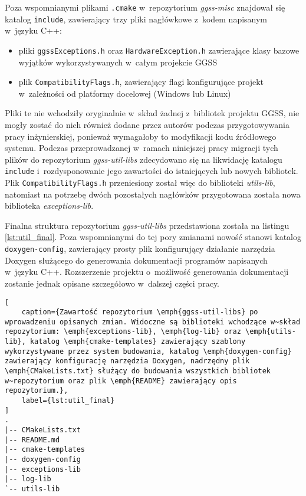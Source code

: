 Poza wspomnianymi plikami \lstinline{.cmake} w~repozytorium \emph{ggss-misc} znajdował się katalog \lstinline{include}, zawierający trzy pliki nagłówkowe z~kodem napisanym w~języku C++:
\begin{itemize}
    \item pliki \lstinline{ggssExceptions.h} oraz \lstinline{HardwareException.h} zawierające klasy bazowe wyjątków wykorzystywanych w~całym projekcie GGSS
    \item plik \lstinline{CompatibilityFlags.h}, zawierający flagi konfigurujące projekt w~zależności od platformy docelowej (Windows lub Linux)
\end{itemize}
Pliki te nie wchodziły oryginalnie w~skład żadnej z~bibliotek projektu GGSS, nie mogły zostać do nich również dodane przez autorów podczas przygotowywania pracy inżynierskiej, ponieważ wymagałoby to modyfikacji kodu źródłowego systemu. Podczas przeprowadzanej w~ramach niniejszej pracy migracji tych plików do repozytorium \emph{ggss-util-libs} zdecydowano się na likwidację katalogu \lstinline{include} i~rozdysponowanie jego zawartości do istniejących lub nowych bibliotek. Plik \lstinline{CompatibilityFlags.h} przeniesiony został więc do biblioteki \emph{utils-lib}, natomiast na potrzebę dwóch pozostałych nagłówków przygotowana została nowa biblioteka \emph{exceptions-lib}.

Finalna struktura repozytorium \emph{ggss-util-libs} przedstawiona została na listingu \ref{lst:util_final}. Poza wspomnianymi do tej pory zmianami nowość stanowi katalog \lstinline{doxygen-config}, zawierający prosty plik konfigurujący działanie narzędzia Doxygen \cite{doxygen} służącego do generowania dokumentacji programów napisanych w~języku C++. Rozszerzenie projektu o~możliwość generowania dokumentacji zostanie jednak opisane szczegółowo w~dalszej części pracy.

\begin{lstlisting}[
    caption={Zawartość repozytorium \emph{ggss-util-libs} po wprowadzeniu opisanych zmian. Widoczne są biblioteki wchodzące w~skład repozytorium: \emph{exceptions-lib}, \emph{log-lib} oraz \emph{utils-lib}, katalog \emph{cmake-templates} zawierający szablony wykorzystywane przez system budowania, katalog \emph{doxygen-config} zawierający konfigurację narzędzia Doxygen, nadrzędny plik \emph{CMakeLists.txt} służący do budowania wszystkich bibliotek w~repozytorium oraz plik \emph{README} zawierający opis repozytorium.},
    label={lst:util_final}
]
.
|-- CMakeLists.txt
|-- README.md
|-- cmake-templates
|-- doxygen-config
|-- exceptions-lib
|-- log-lib
`-- utils-lib
\end{lstlisting}

